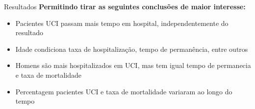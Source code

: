 \documentclass[pdf]
{beamer}
\begin{document}
\begin{frame}{Resultados}
		\textbf{Permitindo tirar as seguintes conclusões de maior interesse:}
		\vspace{0.5cm}
		\begin{itemize}
			\item Pacientes UCI passam mais tempo em hospital, independentemente do resultado
			\item Idade condiciona taxa de hospitalização, tempo de permanência, entre outros
			\item Homens são mais hospitalizados em UCI, mas tem igual tempo de permanecia e taxa de mortalidade
			\item Percentagem pacientes UCI e taxa de mortalidade variaram ao longo do tempo
		\end{itemize}
	
	
\end{frame}
\end{document}
